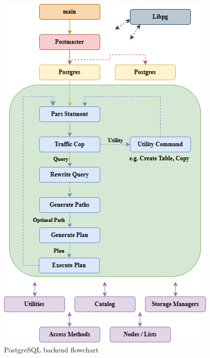 \begin{figure}[hbt!]
\centering
\includegraphics[width=0.3\linewidth]{img/pg_Flowchart.png}
\caption[PostgreSQL backend flowchart]{PostgreSQL backend flowchart~\cite{noauthor_postgresql_nodate}}
\label{fig:pg-query-execution}
\end{figure}
